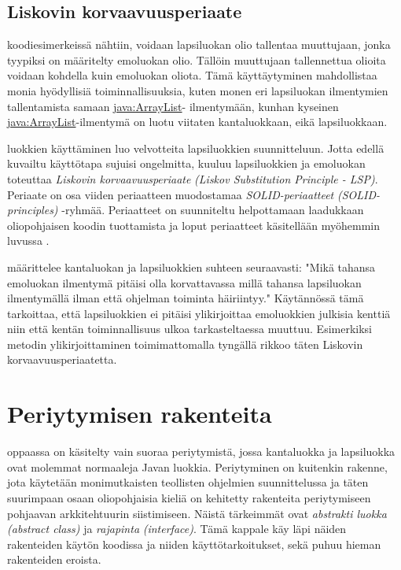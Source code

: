 \documentclass[a4paper,justified,notoc]{tufte-book}
\newcommand{\eng}[1]{\textit{(#1)}}
\newcommand{\new}[1]{\textit{\gls{#1}}}
\newcommand{\neweng}[2]{\new{#1} \eng{#2}}
\newcommand{\java}[1]{\underline{\gls{java:#1}}}
\begin{document}
\begin{fullwidth}
\subsection{Liskovin korvaavuusperiaate}
\label{LSP}

  koodiesimerkeissä nähtiin, voidaan lapsiluokan olio
tallentaa muuttujaan, jonka tyypiksi on määritelty emoluokan olio. Tällöin muuttujaan tallennettua
olioita voidaan kohdella kuin emoluokan oliota. Tämä käyttäytyminen mahdollistaa monia hyödyllisiä
toiminnallisuuksia, kuten monen eri lapsiluokan ilmentymien tallentamista samaan \java{ArrayList}-
ilmentymään, kunhan kyseinen \java{ArrayList}-ilmentymä on luotu viitaten kantaluokkaan, eikä
lapsiluokkaan.

 luokkien käyttäminen luo velvotteita lapsiluokkien suunnitteluun.
Jotta edellä kuvailtu käyttötapa sujuisi ongelmitta, kuuluu lapsiluokkien ja emoluokan toteuttaa
\neweng{Liskovin korvaavuusperiaate}{Liskov Substitution Principle - LSP}. Periaate on osa
viiden periaatteen muodostamaa \neweng{SOLID-periaatteet}{SOLID-principles} -ryhmää. Periaatteet
on suunniteltu helpottamaan laadukkaan oliopohjaisen koodin tuottamista ja loput periaatteet
käsitellään myöhemmin luvussa .

 määrittelee kantaluokan ja lapsiluokkien suhteen
seuraavasti: "Mikä tahansa emoluokan ilmentymä pitäisi olla korvattavassa millä tahansa 
lapsiluokan ilmentymällä ilman että ohjelman toiminta häiriintyy." Käytännössä tämä tarkoittaa,
että lapsiluokkien ei pitäisi ylikirjoittaa emoluokkien julkisia kenttiä niin että kentän
toiminnallisuus ulkoa tarkasteltaessa muuttuu. Esimerkiksi metodin ylikirjoittaminen
toimimattomalla tyngällä rikkoo täten Liskovin korvaavuusperiaatetta.


\section{Periytymisen rakenteita}
\label{periytyminen5}

 oppaassa on käsitelty vain suoraa periytymistä, jossa
\gls{kantaluokka} ja \gls{lapsiluokka} ovat molemmat normaaleja Javan luokkia. Periytyminen on
kuitenkin rakenne, jota käytetään monimutkaisten teollisten ohjelmien suunnittelussa ja täten
suurimpaan osaan oliopohjaisia kieliä on kehitetty rakenteita periytymiseen pohjaavan
arkkitehtuurin siistimiseen. Näistä tärkeimmät ovat \neweng{abstrakti luokka}{abstract class} ja
\neweng{rajapinta}{interface}. Tämä kappale käy läpi näiden rakenteiden käytön koodissa ja niiden
käyttötarkoitukset, sekä puhuu hieman rakenteiden eroista.


\end{fullwidth}
\end{document}
